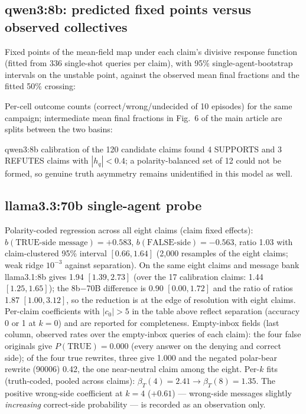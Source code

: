 \documentclass[11pt]{article}
\begin{document}
\subsection{qwen3:8b: predicted fixed points versus observed collectives}

Fixed points of the mean-field map under each claim's divisive response
function (fitted from 336 single-shot queries per claim), with 95\%
single-agent-bootstrap intervals on the unstable point, against the observed
mean final fractions and the fitted 50\% crossing:
\begin{center}
\footnotesize
\resizebox{\textwidth}{!}{}
\end{center}

Per-cell outcome counts (correct/wrong/undecided of 10 episodes) for the same
campaign; intermediate mean final fractions in Fig.~6 of the main article are
splits between the two basins:
\begin{center}
\small

\end{center}

qwen3:8b calibration of the 120 candidate claims found 4 SUPPORTS and 3
REFUTES claims with $|h_q| < 0.4$; a polarity-balanced set of 12 could not be
formed, so genuine truth asymmetry remains unidentified in this model as
well.

\subsection{llama3.3:70b single-agent probe}
\begin{center}

\end{center}
Polarity-coded regression across all eight claims (claim fixed effects):
$b(\text{TRUE-side message}) = +0.583$, $b(\text{FALSE-side}) = -0.563$,
ratio 1.03 with claim-clustered 95\% interval $[0.66, 1.64]$ (2{,}000
resamples of the eight claims; weak ridge $10^{-3}$ against separation). On
the same eight claims and message bank llama3.1:8b gives 1.94 $[1.39, 2.73]$
(over the 17 calibration claims: 1.44 $[1.25, 1.65]$); the 8b$-$70B
difference is 0.90 $[0.00, 1.72]$ and the ratio of ratios 1.87
$[1.00, 3.12]$, so the reduction is at the edge of resolution with eight
claims. Per-claim coefficients with $|c_0| > 5$ in the table above reflect
separation (accuracy 0 or 1 at $k = 0$) and are reported for completeness.
Empty-inbox fields (last column, observed rates over the empty-inbox
queries of each claim): the four false originals give
$P(\mathrm{TRUE}) = 0.000$ (every answer on the denying and correct side); of
the four true rewrites, three give 1.000 and the negated polar-bear rewrite
(90006) 0.42, the one near-neutral claim among the eight.
Per-$k$ fits (truth-coded, pooled across claims):
$\beta_T(4) = 2.41 \to \beta_T(8) = 1.35$. The positive wrong-side
coefficient at $k = 4$ ($+0.61$) --- wrong-side messages slightly
\emph{increasing} correct-side probability --- is recorded as an observation
only.
\end{document}
